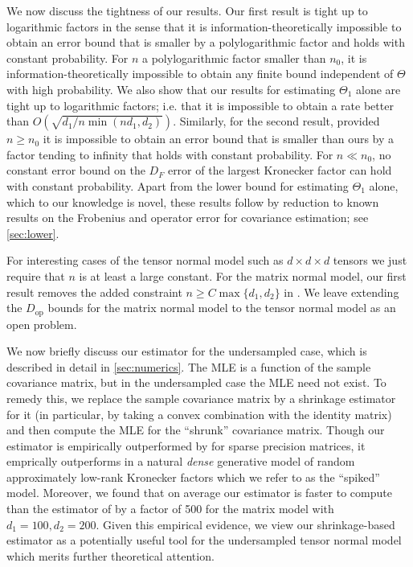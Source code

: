 \documentclass[aos]{imsart}
\theoremstyle{definition}
\numberwithin{equation}{section}
\DeclareMathOperator{\op}{op}
\begin{document}
We now discuss the tightness of our results. Our first result is tight up to logarithmic factors in the sense that it is information-theoretically impossible to obtain an error bound that is smaller by a polylogarithmic factor and holds with constant probability. For $n$ a polylogarithmic factor smaller than $n_0$, it is information-theoretically impossible to obtain any finite bound independent of $\Theta$ with high probability. We also show that our results for estimating $\Theta_1$ alone are tight up to logarithmic factors; i.e. that it is impossible to obtain a rate better than $O(\sqrt{d_1/ n \min(n d_1, d_2)})$. Similarly, for the second result, provided $n \geq n_0$ it is impossible to obtain an error bound that is smaller than ours by a factor tending to infinity that holds with constant probability. For $n \ll n_0$, no constant error bound on the $D_F$ error of the largest Kronecker factor can hold with constant probability. Apart from the lower bound for estimating $\Theta_1$ alone, which to our knowledge is novel, these results follow by reduction to known results on the Frobenius and operator error for covariance estimation; see \cref{sec:lower}.

For interesting cases of the tensor normal model such as $d\times d \times d$ tensors we just require that $n$ is at least a large constant.
For the matrix normal model, our first result removes the added constraint $n \geq C \max\{d_1,d_2\}$ in \cite{tsiligkaridis2013convergence}.
We leave extending the $D_{\op}$ bounds for the matrix normal model to the tensor normal model as an open problem.

We now briefly discuss our estimator for the undersampled case, which is described in detail in \cref{sec:numerics}. The MLE is a function of the sample covariance matrix, but in the undersampled case the MLE need not exist. To remedy this, we replace the sample covariance matrix by a shrinkage estimator for it (in particular, by taking a convex combination with the identity matrix) and then compute the MLE for the ``shrunk'' covariance matrix. Though our estimator is empirically outperformed by \cite{zhou2014gemini} for sparse precision matrices, it emprically outperforms \cite{zhou2014gemini} in a natural \emph{dense} generative model of random approximately low-rank Kronecker factors which we refer to as the ``spiked'' model. Moreover, we found that on average our estimator is faster to compute than the estimator of \cite{zhou2014gemini} by a factor of 500 for the matrix model with $d_1 = 100, d_2 = 200$. Given this empirical evidence, we view our shrinkage-based estimator as a potentially useful tool for the undersampled tensor normal model which merits further theoretical attention.
\end{document}
